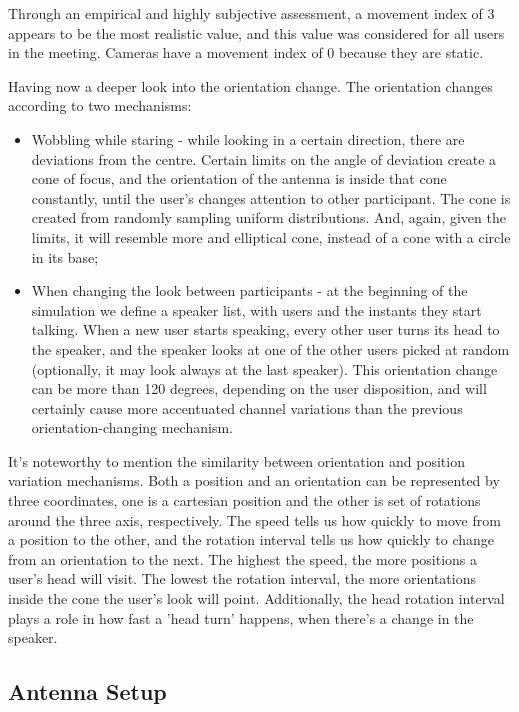 Through an empirical and highly subjective assessment, a movement index of 3 appears to be the most realistic value, and this value was considered for all users in the meeting. Cameras have a movement index of 0 because they are static.


Having now a deeper look into the orientation change. The orientation changes according to two mechanisms: 
\begin{itemize}
    \item Wobbling while staring - while looking in a certain direction, there are deviations from the centre. Certain limits on the angle of deviation create a cone of focus, and the orientation of the antenna is inside that cone constantly, until the user's changes attention to other participant. The cone is created from randomly sampling uniform distributions. And, again, given the limits, it will resemble more and elliptical cone, instead of a cone with a circle in its base;
    \item When changing the look between participants - at the beginning of the simulation we define a speaker list, with users and the instants they start talking. When a new user starts speaking, every other user turns its head to the speaker, and the speaker looks at one of the other users picked at random (optionally, it may look always at the last speaker). This orientation change can be more than 120 degrees, depending on the user disposition, and will certainly cause more accentuated channel variations than the previous orientation-changing mechanism.
\end{itemize}

It's noteworthy to mention the similarity between orientation and position variation mechanisms. Both a position and an orientation can be represented by three coordinates, one is a cartesian position and the other is set of rotations around the three axis, respectively. The speed tells us how quickly to move from a position to the other, and the rotation interval tells us how quickly to change from an orientation to the next. The highest the speed, the more positions a user's head will visit. The lowest the rotation interval, the more orientations inside the cone the user's look will point. Additionally, the head rotation interval plays a role in how fast a 'head turn' happens, when there's a change in the speaker. 

\subsection*{Antenna Setup}

